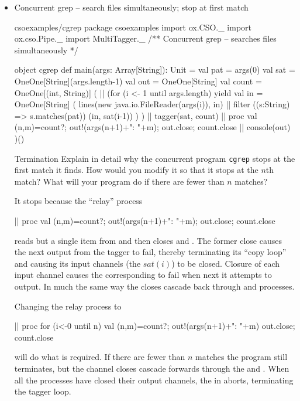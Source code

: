\documentclass{concdistfoils}
\begin{document}
\begin{slide}
\begin{itemize}
\item Concurrent grep -- search files simultaneously; stop at first match
\begin{hideobj}{csoexamples/cgrep}
package csoexamples
import  ox.CSO._
import  ox.cso.Pipe._
import  MultiTagger._
/** 
   Concurrent grep -- searches files simultaneously
*/
\end{hideobj}
\begin{obj}{}
object cgrep
{ def main(args: Array[String]): Unit = 
  { val pat = args(0)
    val sat = OneOne[String](args.length-1)
    val out = OneOne[String]
    val count = OneOne[(int, String)]
    ( || (for (i <- 1 until args.length) yield
          { val in  = OneOne[String]
            (  lines(new java.io.FileReader(args(i)), in)
            || filter ((s:String) => s.matches(pat)) (in, sat(i-1))
            )
          }
         )
      || tagger(sat, count) 
      || proc { val (n,m)=count?; out!(args(n+1)+": "+m); out.close; count.close }      
      || console(out) 
    )()
  }
}
\end{obj}
\begin{ex**}{Termination}
Explain in detail why the concurrent program \texttt{cgrep}  stops at the first 
match it finds. 
How would you modify it so that it stops at the $n$th match? What will your
program do if there are fewer than $n$ matches?
\begin{ans}
It stops because the ``relay'' process
\begin{scala}
      || proc { val (n,m)=count?; out!(args(n+1)+": "+m); out.close; count.close }      
\end{scala}
reads but a single item from  and then 
closes  and .
The former close causes the next output from the tagger to 
fail, thereby terminating its ``copy loop'' and
causing its input channels (the $sat(i)$) to be closed. Closure of
each input channel causes the corresponding 
to fail when next it attempts to output. In much the same
way the closes cascade back through and 
processes.

Changing the  relay process to
\begin{scala}
      || proc { for (i<-0 until n) 
                { val (n,m)=count?; out!(args(n+1)+": "+m) }
                out.close; count.close 
              }      
\end{scala}
will do what is required. If there are fewer than $n$ matches the program still terminates,
but the channel closes cascade forwards through the  and
. When all the   processes have closed their
output channels, the  in  aborts, terminating
the tagger loop.
\end{ans}
\end{ex**}
\end{itemize}
\end{slide}
\end{document}
